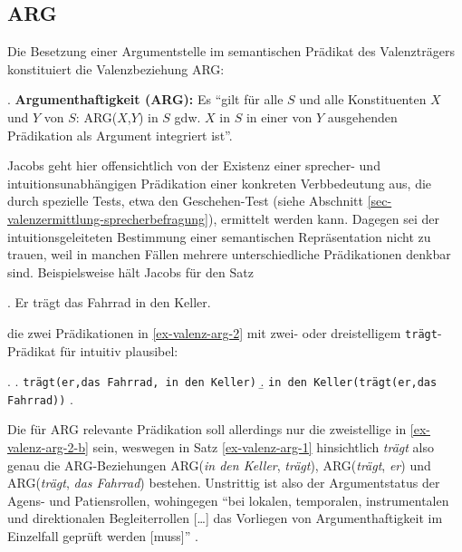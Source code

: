

\subsection{ARG} \label{sec-arg}

Die Besetzung einer Argumentstelle im semantischen Prädikat des Valenzträgers konstituiert die Valenzbeziehung ARG:

\ex. {\bf Argumenthaftigkeit (ARG):} Es "`gilt für alle $S$ und alle Konstituenten $X$ und $Y$ von $S$: ARG($X$,$Y$) in $S$ gdw. $X$ in $S$ in einer von $Y$ ausgehenden Prädikation als Argument integriert ist"'. \citep[17]{Jacobs:94}

Jacobs geht hier offensichtlich von der Existenz einer sprecher- und intuitionsunabhängigen Prädikation einer konkreten Verbbedeutung aus, die durch spezielle Tests, etwa den Gesche\-hen-Test (siehe Abschnitt \ref{sec-valenzermittlung-sprecherbefragung}), ermittelt werden kann. Dagegen sei der intuitionsgeleiteten Bestimmung einer semantischen Repräsentation nicht zu trauen, weil in manchen Fällen mehrere unterschiedliche Prädikationen denkbar sind. Beispielsweise hält Jacobs für den Satz

\ex. Er trägt das Fahrrad in den Keller. \label{ex-valenz-arg-1}

die zwei Prädikationen in \ref{ex-valenz-arg-2} mit zwei- oder dreistelligem {\tt trägt}-Prädikat für intuitiv plausibel:

\ex. \label{ex-valenz-arg-2}
\a. {\tt trägt(er,das Fahrrad, in den Keller)}
\b. {\tt in den Keller(trägt(er,das Fahrrad))} \label{ex-valenz-arg-2-b}
\z. \citep[(6),(7)]{Jacobs:94}

Die für ARG relevante Prädikation soll allerdings nur die zweistellige in \ref{ex-valenz-arg-2-b} sein, weswegen in Satz \ref{ex-valenz-arg-1} hinsichtlich {\it trägt} also genau die ARG-Beziehungen ARG({\it in den Keller}, {\it trägt}), ARG({\it trägt}, {\it er}) und ARG({\it trägt}, {\it das Fahrrad}) bestehen. Unstrittig ist also der Argumentstatus der Agens- und Patiensrollen, wohingegen "`bei lokalen, temporalen, instrumentalen und direktionalen Begleiterrollen [\ldots] das Vorliegen von Argumenthaftigkeit im Einzelfall geprüft werden [muss]"' \citep[768]{Storrer:03}.

